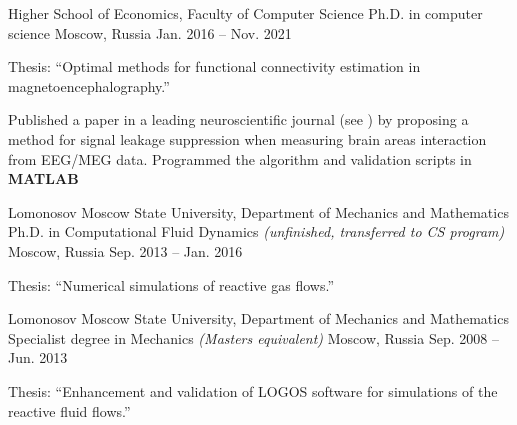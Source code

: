 \begin{cventries}
  \cventry
    {Higher School of Economics, Faculty of Computer Science}
    {Ph.D. in computer science}
    {Moscow, Russia}
    {Jan. 2016 -- Nov. 2021}
    {
      \begin{cvitems}
        \item {Thesis: ``Optimal methods for functional connectivity estimation in magnetoencephalography.''}
      \item{Published a paper in a leading neuroscientific journal (see \cite{psiicos}})
          by proposing a method for signal leakage suppression when measuring brain areas interaction from EEG/MEG data. Programmed the algorithm and validation scripts in \textbf{MATLAB}
      \end{cvitems}
    }
  \cventry
    {Lomonosov Moscow State University, Department of Mechanics and Mathematics}
    {Ph.D. in Computational Fluid Dynamics \emph{(unfinished, transferred to CS program)}}
    {Moscow, Russia}
    {Sep. 2013 --  Jan. 2016}
    {
      \begin{cvitems}
        \item {Thesis: ``Numerical simulations of reactive gas flows.''}
      \end{cvitems}
    }
  \cventry
    {Lomonosov Moscow State University, Department of Mechanics and Mathematics}
{Specialist degree in Mechanics \emph{(Masters equivalent)}}
    {Moscow, Russia}
    {Sep. 2008 -- Jun. 2013}
    {
      \begin{cvitems}
        \item{Thesis: ``Enhancement and validation of LOGOS software for simulations of the reactive fluid flows.''}
      \end{cvitems}
    }
\end{cventries}
